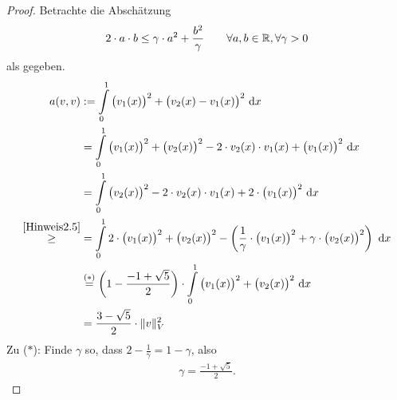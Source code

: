 \begin{proof}
	Betrachte die Abschätzung
	\begin{align}\label{Hinweis2.5}
		2\cdot a\cdot b\leq\gamma\cdot a^2+\frac{b^2}{\gamma}\qquad\forall a,b\in\mathbb{R},\forall\gamma>0
	\end{align}
	als gegeben.
	\begin{align*}
		a(v,v)&:=\int\limits_0^1 \big(v_1(x)\big)^2+\big(v_2(x)-v_1(x)\big)^2\text{ d} x\\
		&=\int\limits_0^1 \big(v_1(x)\big)^2+\big(v_2(x)\big)^2-2\cdot v_2(x)\cdot v_1(x)+\big(v_1(x)\big)^2\text{ d} x\\
		&=\int\limits_0^1 \big(v_2(x)\big)^2-2\cdot v_2(x)\cdot v_1(x)+2\cdot\big(v_1(x)\big)^2\text{ d} x\\
		\overset{\eqref{Hinweis2.5}}{\geq}&=
		\int\limits_0^1 2\cdot\big(v_1(x)\big)^2+\big(v_2(x)\big)^2-\left(\frac{1}{\gamma}\cdot\big(v_1(x)\big)^2+\gamma\cdot\big(v_2(x)\big)^2\right)\text{ d} x\\
		&\stackrel{(\ast)}{=}
		\left(1-\frac{-1+\sqrt{5}}{2}\right)\cdot\int\limits_0^1 \big(v_1(x)\big)^2+\big(v_2(x)\big)^2\text{ d} x\\
		&=\frac{3-\sqrt{5}}{2}\cdot\Vert v\Vert^2_V
	\end{align*}
	Zu ($\ast$): Finde $\gamma$ so, dass $2-\frac{1}{\gamma}=1-\gamma$, also
	\begin{align*}
		\gamma=\frac{-1+\sqrt{5}}{2}.
	\end{align*}
\end{proof}

